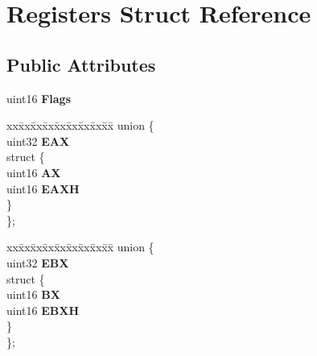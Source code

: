 \hypertarget{struct_registers}{}\section{Registers Struct Reference}
\label{struct_registers}
\subsection*{Public Attributes}
\begin{DoxyCompactItemize}
\item 
\mbox{\label{struct_registers_a426d58afd66000d206529f0ee1274beb}} 
uint16 {\bfseries Flags}
\item 
\mbox{\label{struct_registers_ab126afdb956ea470e61bd42807adb902}} 
\begin{tabbing}
xx\=xx\=xx\=xx\=xx\=xx\=xx\=xx\=xx\=\kill
union \{\\
\>uint32 {\bfseries EAX}\\
\mbox{\label{union_registers_1_1_0D2_a37601623105d07092ea007485b23722a}} 
\>struct \{\\
\>\>uint16 {\bfseries AX}\\
\>\>uint16 {\bfseries EAXH}\\
\>\} \\
\}; \\

\end{tabbing}\item 
\mbox{\label{struct_registers_a50c52167f5fc2b05e2213833c4ac21af}} 
\begin{tabbing}
xx\=xx\=xx\=xx\=xx\=xx\=xx\=xx\=xx\=\kill
union \{\\
\>uint32 {\bfseries EBX}\\
\mbox{\label{union_registers_1_1_0D4_a128b2be0489d7e2bcae83d11b788be72}} 
\>struct \{\\
\>\>uint16 {\bfseries BX}\\
\>\>uint16 {\bfseries EBXH}\\
\>\} \\
\}; \\


\end{tabbing}
\end{DoxyCompactItemize}
